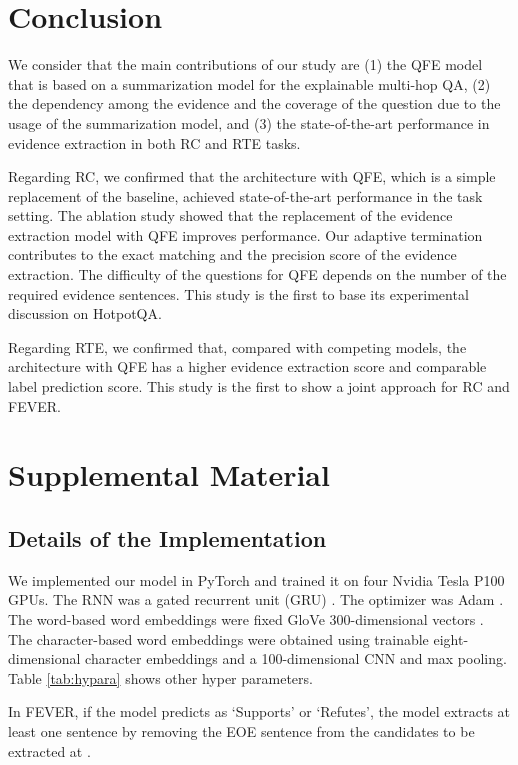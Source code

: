 \documentclass[11pt,a4paper]{article}
\theoremstyle{definition}
\begin{document}
	\section{Conclusion}
	We consider that the main contributions of our study are 
	(1) the QFE model that is based on a summarization model for the explainable multi-hop QA, 
	(2) the dependency among the evidence and the coverage of the question due to the usage of the summarization model, 
	and (3) the state-of-the-art performance in evidence extraction in both RC and RTE tasks.
	
	Regarding RC, we confirmed that the architecture with QFE, which is a simple replacement of the baseline, achieved state-of-the-art performance in the task setting.
	The ablation study showed that the replacement of the evidence extraction model with QFE improves performance.
	Our adaptive termination contributes to the exact matching and the precision score of the evidence extraction.
	The difficulty of the questions for QFE depends on the number of the required evidence sentences.
	This study is the first to base its experimental discussion on HotpotQA.
	
	Regarding RTE, we confirmed that, compared with competing models, the architecture with QFE has a higher evidence extraction score and comparable label prediction score.
	This study is the first to show a joint approach for RC and FEVER.
	
	
	
	
	\appendix
	\section{Supplemental Material}
	\subsection{Details of the Implementation \label{sec:implement}}
	We implemented our model in PyTorch and trained it on four Nvidia Tesla P100 GPUs. The RNN was a gated recurrent unit (GRU) \citep{gru}. The optimizer was Adam \cite{adam}. The word-based word embeddings were fixed GloVe 300-dimensional vectors \cite{glove}. The character-based word embeddings were obtained using trainable eight-dimensional character embeddings and a 100-dimensional CNN and max pooling. Table \ref{tab:hypara} shows other hyper parameters.
	
	In FEVER, if the model predicts  as `Supports' or `Refutes', the model extracts at least one sentence by removing the EOE sentence from the candidates to be extracted at . 
	
\end{document}
